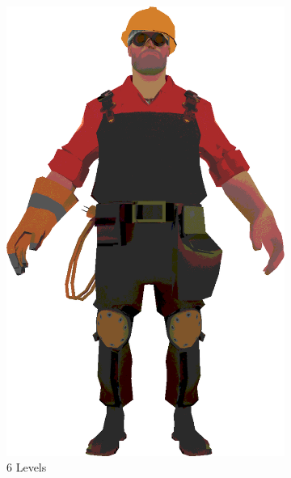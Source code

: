 \begin{figure}[h]
\begin{subfigure}[b]{0.16\textwidth}
        \includegraphics[width=\textwidth]{img/textures/CelShadeTexture6.png}
        \caption{6 Levels}
        \label{fig:CelShadeTexture4}
    \end{subfigure}
    ~
    \begin{subfigure}[b]{0.16\textwidth}

\end{subfigure}
\end{figure}
